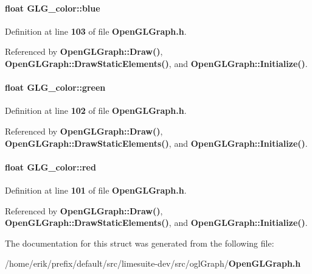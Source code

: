\paragraph[{blue}]{\setlength{\rightskip}{0pt plus 5cm}float G\+L\+G\+\_\+color\+::blue}\label{structGLG__color_a7896bc4f2cfc01f1a19faf79e6c4aa3a}


Definition at line {\bf 103} of file {\bf Open\+G\+L\+Graph.\+h}.



Referenced by {\bf Open\+G\+L\+Graph\+::\+Draw()}, {\bf Open\+G\+L\+Graph\+::\+Draw\+Static\+Elements()}, and {\bf Open\+G\+L\+Graph\+::\+Initialize()}.

\paragraph[{green}]{\setlength{\rightskip}{0pt plus 5cm}float G\+L\+G\+\_\+color\+::green}\label{structGLG__color_a813e6bcadaf50e17db0d5db507ac4f2c}


Definition at line {\bf 102} of file {\bf Open\+G\+L\+Graph.\+h}.



Referenced by {\bf Open\+G\+L\+Graph\+::\+Draw()}, {\bf Open\+G\+L\+Graph\+::\+Draw\+Static\+Elements()}, and {\bf Open\+G\+L\+Graph\+::\+Initialize()}.

\paragraph[{red}]{\setlength{\rightskip}{0pt plus 5cm}float G\+L\+G\+\_\+color\+::red}\label{structGLG__color_acac1522be88144b1c8c79af8d5eb20de}


Definition at line {\bf 101} of file {\bf Open\+G\+L\+Graph.\+h}.



Referenced by {\bf Open\+G\+L\+Graph\+::\+Draw()}, {\bf Open\+G\+L\+Graph\+::\+Draw\+Static\+Elements()}, and {\bf Open\+G\+L\+Graph\+::\+Initialize()}.



The documentation for this struct was generated from the following file\+:\begin{DoxyCompactItemize}
\item 
/home/erik/prefix/default/src/limesuite-\/dev/src/ogl\+Graph/{\bf Open\+G\+L\+Graph.\+h}\end{DoxyCompactItemize}
